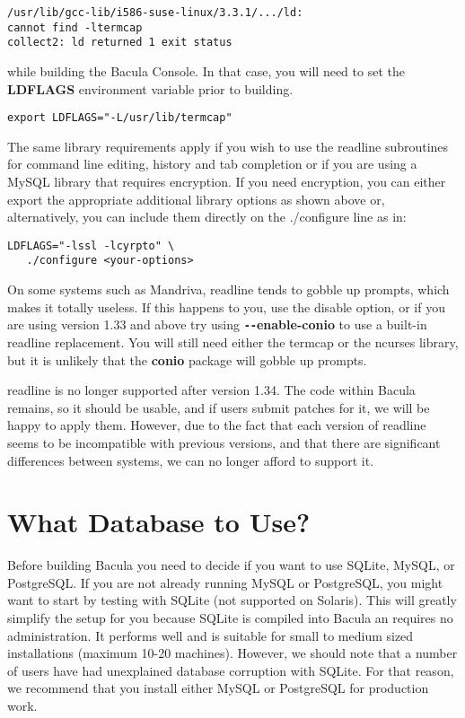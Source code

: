 \footnotesize
\begin{verbatim}
/usr/lib/gcc-lib/i586-suse-linux/3.3.1/.../ld:
cannot find -ltermcap
collect2: ld returned 1 exit status
\end{verbatim}
\normalsize

while building the Bacula Console. In that case, you will need to set the {\bf
LDFLAGS} environment variable prior to building. 

\footnotesize
\begin{verbatim}
export LDFLAGS="-L/usr/lib/termcap"
\end{verbatim}
\normalsize

The same library requirements apply if you wish to use the readline subroutines
for command line editing, history and tab completion or if you are using a
MySQL library that requires encryption. If you need encryption, you can either
export the appropriate additional library options as shown above or,
alternatively, you can include them directly on the ./configure line as in:

\footnotesize
\begin{verbatim}
LDFLAGS="-lssl -lcyrpto" \
   ./configure <your-options>
\end{verbatim}
\normalsize

On some systems such as Mandriva, readline tends to
gobble up prompts, which makes it totally useless. If this happens to you, use
the disable option, or if you are using version 1.33 and above try using {\bf
\verb:--:enable-conio} to use a built-in readline replacement. You will still need
either the termcap or the ncurses library, but it is unlikely that the {\bf conio}
package will gobble up prompts. 

readline is no longer supported after version 1.34.  The code within Bacula
remains, so it should be usable, and if users submit patches for it, we will
be happy to apply them.  However, due to the fact that each version of
readline seems to be incompatible with previous versions, and that there
are significant differences between systems, we can no longer afford to
support it.

\section{What Database to Use?}
\label{DB}

Before building Bacula you need to decide if you want to use SQLite, MySQL, or
PostgreSQL. If you are not already running MySQL or PostgreSQL, you might
want to start by testing with SQLite (not supported on Solaris).
This will greatly simplify the setup for you
because SQLite is compiled into Bacula an requires no administration. It
performs well and is suitable for small to medium sized installations (maximum
10-20 machines). However, we should note that a number of users have
had unexplained database corruption with SQLite. For that reason, we
recommend that you install either MySQL or PostgreSQL for production
work.


